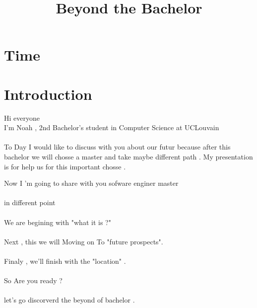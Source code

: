 \documentclass{article}
\title{Beyond the Bachelor}
\begin{document}
\section{Time}
\section{Introduction}
Hi everyone \\
I'm Noah , 2nd Bachelor’s student in Computer Science at UCLouvain \\\\

To Day I would like to discuss with you about our futur because after this bachelor 
we will chosse a  master and take maybe different path . My presentation is for help us for this 
important chosse . 

Now I 'm going to share with you sofware enginer master \\\\
in different point \\\\
We are begining with "what it is ?" \\\\
Next ,  this  we will Moving on To "future prospects". \\\\
Finaly , we’ll finish with the "location" .\\\\
So Are you ready ?\\\\
let's go discorverd the beyond of bachelor .
\end{document}
